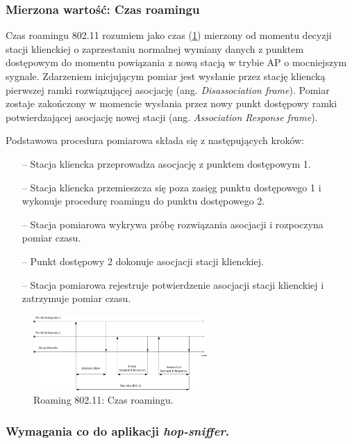 \subsubsection{Mierzona wartość: Czas roamingu}
Czas roamingu 802.11 rozumiem jako czas (\ref{RoamingTime}) mierzony od momentu decyzji stacji klienckiej o zaprzestaniu normalnej wymiany danych z punktem dostępowym do momentu powiązania z nową stacją w trybie AP o mocniejszym sygnale. Zdarzeniem inicjującym pomiar jest wysłanie przez stację kliencką pierwszej ramki rozwiązującej asocjację (ang. \emph{Disassociation frame}). Pomiar zostaje zakończony w momencie wysłania przez nowy punkt dostępowy ramki potwierdzającej asocjację nowej stacji (ang. \emph{Association Response frame}).

Podstawowa procedura pomiarowa składa się z następujących kroków:
\begin{itemize}
\item[--] Stacja kliencka przeprowadza asocjację z punktem dostępowym 1.
\item[--] Stacja kliencka przemieszcza się poza zasięg punktu dostępowego 1 i wykonuje procedurę roamingu do punktu dostępowego 2.
\item[--] Stacja pomiarowa wykrywa próbę rozwiązania asocjacji i rozpoczyna pomiar czasu.
\item[--] Punkt dostępowy 2 dokonuje asocjacji stacji klienckiej.
\item[--] Stacja pomiarowa rejestruje potwierdzenie asocjacji stacji klienckiej i zatrzymuje pomiar czasu.
\end{itemize}

\begin{figure}[htb]
\begin{center}
\includegraphics[width=250px]{img/RoamingTime}
\caption{Roaming 802.11: Czas roamingu.}
\label{RoamingTime}
\end{center}
\end{figure}

\subsubsection{Wymagania co do aplikacji \emph{hop-sniffer}.}

